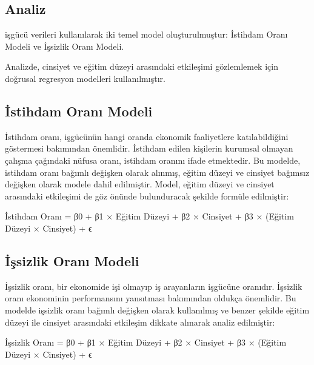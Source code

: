 \documentclass[
  11pt,
  a4paper,
  DIV=11,
  numbers=noendperiod]{scrartcl}
\begin{document}
\subsection{Analiz}\label{analiz-1}

işgücü verileri kullanılarak iki temel model oluşturulmuştur: İstihdam
Oranı Modeli ve İşsizlik Oranı Modeli.

Analizde, cinsiyet ve eğitim düzeyi arasındaki etkileşimi gözlemlemek
için doğrusal regresyon modelleri kullanılmıştır.

\subsection{İstihdam Oranı Modeli}\label{istihdam-oranux131-modeli}

İstihdam oranı, işgücünün hangi oranda ekonomik faaliyetlere
katılabildiğini göstermesi bakımından önemlidir. İstihdam edilen
kişilerin kurumsal olmayan çalışma çağındaki nüfusa oranı, istihdam
oranını ifade etmektedir. Bu modelde, istihdam oranı bağımlı değişken
olarak alınmış, eğitim düzeyi ve cinsiyet bağımsız değişken olarak
modele dahil edilmiştir. Model, eğitim düzeyi ve cinsiyet arasındaki
etkileşimi de göz önünde bulunduracak şekilde formüle edilmiştir:

İstihdam Oranı = β0 + β1 × Eğitim Düzeyi + β2 × Cinsiyet + β3 × (Eğitim
Düzeyi × Cinsiyet) + ϵ

\subsection{İşsizlik Oranı Modeli}\label{iux15fsizlik-oranux131-modeli}

İşsizlik oranı, bir ekonomide işi olmayıp iş arayanların işgücüne
oranıdır. İşsizlik oranı ekonominin performansını yansıtması bakımından
oldukça önemlidir. Bu modelde işsizlik oranı bağımlı değişken olarak
kullanılmış ve benzer şekilde eğitim düzeyi ile cinsiyet arasındaki
etkileşim dikkate alınarak analiz edilmiştir:

İşsizlik Oranı = β0 + β1 × Eğitim Düzeyi + β2 × Cinsiyet + β3 × (Eğitim
Düzeyi × Cinsiyet) + ϵ
\end{document}

